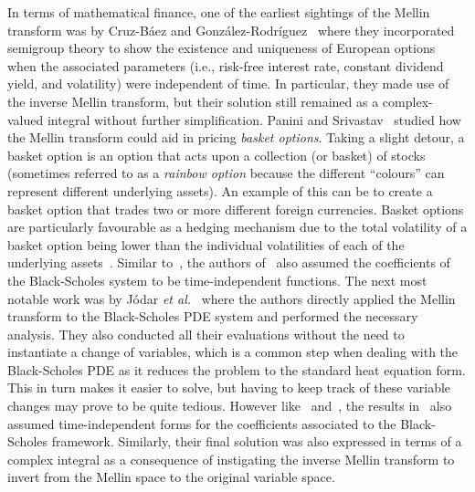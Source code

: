 		In terms of mathematical finance, one of the earliest sightings of the Mellin transform was by Cruz-B\'aez and Gonz\'alez-Rodr\'iguez~\cite{Cruz2002} where they incorporated semigroup theory to show the existence and uniqueness of European options when the associated parameters (i.e., risk-free interest rate, constant dividend yield, and volatility) were independent of time. In particular, they made use of the inverse Mellin transform, but their solution still remained as a complex-valued integral without further simplification. Panini and Srivastav~\cite{Panini2003} studied how the Mellin transform could aid in pricing \emph{basket options}. Taking a slight detour, a basket option is an option that acts upon a collection (or basket) of stocks (sometimes referred to as a \emph{rainbow option} because the different ``colours'' can represent different underlying assets). An example of this can be to create a basket option that trades two or more different foreign currencies. Basket options are particularly favourable as a hedging mechanism due to the total volatility of a basket option being lower than the individual volatilities of each of the underlying assets~\cite{Jiang2005}. Similar to~\cite{Cruz2002}, the authors of~\cite{Panini2003} also assumed the coefficients of the Black-Scholes system to be time-independent functions. The next most notable work was by J\'odar \emph{et al.}~\cite{Jodar2005} where the authors directly applied the Mellin transform to the Black-Scholes PDE system and performed the necessary analysis. They also conducted all their evaluations without the need to instantiate a change of variables, which is a common step when dealing with the Black-Scholes PDE as it reduces the problem to the standard heat equation form. This in turn makes it easier to solve, but having to keep track of these variable changes may prove to be quite tedious. However like~\cite{Cruz2002} and~\cite{Panini2003}, the results in~\cite{Jodar2005} also assumed time-independent forms for the coefficients associated to the Black-Scholes framework. Similarly, their final solution was also expressed in terms of a complex integral as a consequence of instigating the inverse Mellin transform to invert from the Mellin space to the original variable space.
